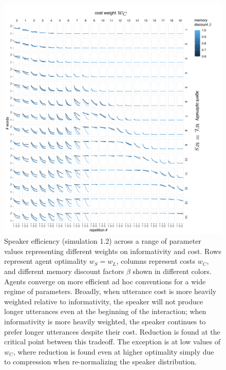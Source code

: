 \documentclass[11pt, floatsintext]{apa6}
\begin{document}
 \begin{figure}
\centering
    \includegraphics[scale=.7]{conjunction_grid.pdf}
  \caption{Speaker efficiency (simulation 1.2) across a range of parameter values representing different weights on informativity and cost. Rows represent agent optimality $w_S = w_L$, columns represent costs $w_C$, and different memory discount factors $\beta$ shown in different colors. Agents converge on more efficient ad hoc conventions for a wide regime of parameters. Broadly, when utterance cost is more heavily weighted relative to informativity, the speaker will not produce longer utterances even at the beginning of the interaction; when informativity is more heavily weighted, the speaker continues to prefer longer utterances despite their cost. Reduction is found at the critical point between this tradeoff. The exception is at low values of $w_C$, where reduction is found even at higher optimality simply due to compression when re-normalizing the speaker distribution.}
  \label{fig:conjunction_grid}
\end{figure}
\end{document}
